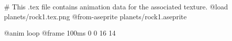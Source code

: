 # This .tex file contains animation data for the associated texture.
@load planets/rock1.tex.png
@from-aseprite planets/rock1.aseprite

@anim loop
	@frame 100ms 0 0 16 14
